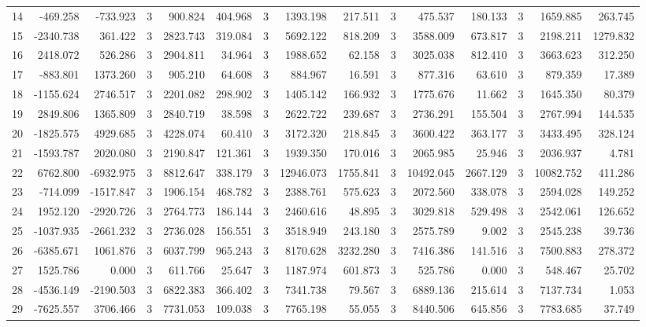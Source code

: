 \begin{table}[ht]
\begin{tabular}{lrrrrrrrrrrrrrr}
14 & -469.258 & -733.923 & 3 & 900.824 & 404.968 & 3 & 1393.198 & 217.511 & 3 & 475.537 & 180.133 & 3 & 1659.885 & 263.745 \\
15 & -2340.738 & 361.422 & 3 & 2823.743 & 319.084 & 3 & 5692.122 & 818.209 & 3 & 3588.009 & 673.817 & 3 & 2198.211 & 1279.832 \\
16 & 2418.072 & 526.286 & 3 & 2904.811 & 34.964 & 3 & 1988.652 & 62.158 & 3 & 3025.038 & 812.410 & 3 & 3663.623 & 312.250 \\
17 & -883.801 & 1373.260 & 3 & 905.210 & 64.608 & 3 & 884.967 & 16.591 & 3 & 877.316 & 63.610 & 3 & 879.359 & 17.389 \\
18 & -1155.624 & 2746.517 & 3 & 2201.082 & 298.902 & 3 & 1405.142 & 166.932 & 3 & 1775.676 & 11.662 & 3 & 1645.350 & 80.379 \\
19 & 2849.806 & 1365.809 & 3 & 2840.719 & 38.598 & 3 & 2622.722 & 239.687 & 3 & 2736.291 & 155.504 & 3 & 2767.994 & 144.535 \\
20 & -1825.575 & 4929.685 & 3 & 4228.074 & 60.410 & 3 & 3172.320 & 218.845 & 3 & 3600.422 & 363.177 & 3 & 3433.495 & 328.124 \\
21 & -1593.787 & 2020.080 & 3 & 2190.847 & 121.361 & 3 & 1939.350 & 170.016 & 3 & 2065.985 & 25.946 & 3 & 2036.937 & 4.781 \\
22 & 6762.800 & -6932.975 & 3 & 8812.647 & 338.179 & 3 & 12946.073 & 1755.841 & 3 & 10492.045 & 2667.129 & 3 & 10082.752 & 411.286 \\
23 & -714.099 & -1517.847 & 3 & 1906.154 & 468.782 & 3 & 2388.761 & 575.623 & 3 & 2072.560 & 338.078 & 3 & 2594.028 & 149.252 \\
24 & 1952.120 & -2920.726 & 3 & 2764.773 & 186.144 & 3 & 2460.616 & 48.895 & 3 & 3029.818 & 529.498 & 3 & 2542.061 & 126.652 \\
25 & -1037.935 & -2661.232 & 3 & 2736.028 & 156.551 & 3 & 3518.949 & 243.180 & 3 & 2575.789 & 9.002 & 3 & 2545.238 & 39.736 \\
26 & -6385.671 & 1061.876 & 3 & 6037.799 & 965.243 & 3 & 8170.628 & 3232.280 & 3 & 7416.386 & 141.516 & 3 & 7500.883 & 278.372 \\
27 & 1525.786 & 0.000 & 3 & 611.766 & 25.647 & 3 & 1187.974 & 601.873 & 3 & 525.786 & 0.000 & 3 & 548.467 & 25.702 \\
28 & -4536.149 & -2190.503 & 3 & 6822.383 & 366.402 & 3 & 7341.738 & 79.567 & 3 & 6889.136 & 215.614 & 3 & 7137.734 & 1.053 \\
29 & -7625.557 & 3706.466 & 3 & 7731.053 & 109.038 & 3 & 7765.198 & 55.055 & 3 & 8440.506 & 645.856 & 3 & 7783.685 & 37.749 \\

\end{tabular}
\end{table}
